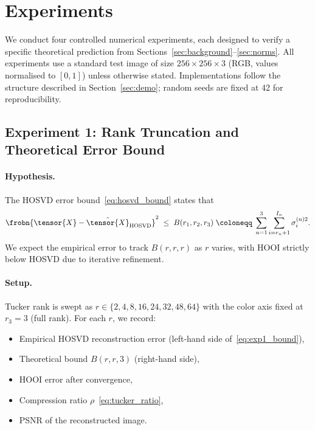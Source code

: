 
\section{Experiments}
\label{sec:experiments}

We conduct four controlled numerical experiments, each designed to verify
a specific theoretical prediction from Sections~\ref{sec:background}--\ref{sec:norms}.
All experiments use a standard test image of size $256 \times 256 \times 3$
(RGB, values normalised to $[0, 1]$) unless otherwise stated.
Implementations follow the structure described in Section~\ref{sec:demo};
random seeds are fixed at 42 for reproducibility.

\subsection{Experiment 1: Rank Truncation and Theoretical Error Bound}
\label{subsec:exp_rank}

\paragraph{Hypothesis.}
The HOSVD error bound~\eqref{eq:hosvd_bound} states that
\begin{equation}
  \frobn{\tensor{X} - \hat{\tensor{X}}_{\mathrm{HOSVD}}}^2
  \;\leq\;
  B(r_1, r_2, r_3)
  \;\coloneqq\;
  \sum_{n=1}^{3} \sum_{i=r_n+1}^{I_n} \sigma_i^{(n)2}.
  \label{eq:exp1_bound}
\end{equation}
We expect the empirical error to track $B(r,r,r)$ as $r$ varies,
with HOOI strictly below HOSVD due to iterative refinement.

\paragraph{Setup.}
Tucker rank is swept as $r \in \{2, 4, 8, 16, 24, 32, 48, 64\}$
with the color axis fixed at $r_3 = 3$ (full rank).
For each $r$, we record:
\begin{itemize}
  \item Empirical HOSVD reconstruction error (left-hand side of~\eqref{eq:exp1_bound}),
  \item Theoretical bound $B(r, r, 3)$ (right-hand side),
  \item HOOI error after convergence,
  \item Compression ratio $\rho$~\eqref{eq:tucker_ratio},
  \item PSNR of the reconstructed image.
\end{itemize}

